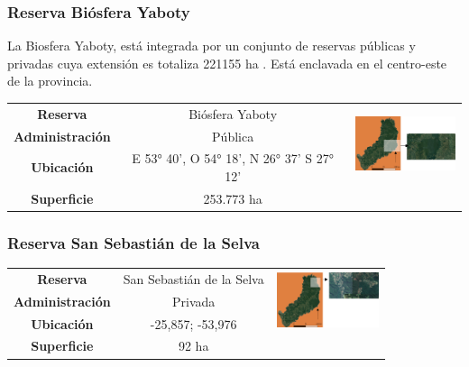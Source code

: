 \subsubsection{Reserva Biósfera Yaboty}
La Biosfera Yaboty, está integrada por un conjunto de reservas públicas y privadas cuya extensión es totaliza 221155 ha
 \cite{noauthor_sib_nodate-1}. Está enclavada en el centro-este de la provincia.
\begin{table}[H]
    \centering
    \begin{tabular}{|c|c|c|}
        \hline
        \textbf{Reserva} & Biósfera Yaboty &   \multirow{ 3}{*}{\includegraphics[width=30mm]{Imagenes/Yaboty.png}}\\ 
        \textbf{Administración} & Pública\\
        \textbf{Ubicación} & E 53° 40’, O 54° 18’, N 26° 37’ S 27° 12’ \\
        \textbf{Superficie} & 253.773 ha\\
        \hline
    \end{tabular}
    \label{Yaboty}
\end{table}

\subsubsection{Reserva San Sebastián de la Selva}
\begin{table}[H]
\centering
\begin{tabular}{|c|c|c|}
\hline
 \textbf{Reserva} & San Sebastián de la Selva &   \multirow{ 3}{*}{\includegraphics[width=30mm]{Imagenes/San Sebastian.png}}\\ 
\textbf{Administración} & Privada\\
        
        \textbf{Ubicación} & -25,857; -53,976 \\
         
        \textbf{Superficie} & 92 ha\\
\hline        
\end{tabular}

\label{San Sebastian}
\end{table}

